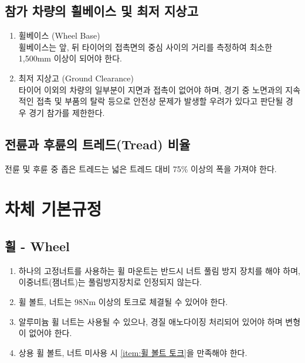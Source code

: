 \documentclass[final,a4paper,10pt]{report}
\begin{document}
\section{참가 차량의 휠베이스 및 최저 지상고}
\begin{enumerate}
  \item 휠베이스 (Wheel Base)\\
    휠베이스는 앞, 뒤 타이어의 접촉면의 중심 사이의 거리를 측정하여 최소한 1,500mm 이상이 되어야 한다.
  \item 최저 지상고 (Ground Clearance)\\
    타이어 이외의 차량의 일부분이 지면과 접촉이 없어야 하며, 경기 중 노면과의 지속적인 접촉 및 부품의 탈락 등으로 안전상 문제가 발생할 우려가 있다고 판단될 경우 경기 참가를 제한한다.
\end{enumerate}

\section{전륜과 후륜의 트레드(Tread) 비율}
전륜 및 후륜 중 좁은 트레드는 넓은 트레드 대비 75\% 이상의 폭을 가져야 한다.

\chapter{차체 기본규정}

\section{휠 - Wheel}
\begin{enumerate}
  \item 하나의 고정너트를 사용하는 휠 마운트는 반드시 너트 풀림 방지 장치를 해야 하며, 이중너트(잼너트)는 풀림방지장치로 인정되지 않는다.
  \item \label{item:휠 볼트 토크} 휠 볼트, 너트는 98Nm 이상의 토크로 체결될 수 있어야 한다.
  \item 알루미늄 휠 너트는 사용될 수 있으나, 경질 애노다이징 처리되어 있어야 하며 변형이 없어야 한다.
  \item 상용 휠 볼트, 너트 미사용 시 \cref{item:휠 볼트 토크}을 만족해야 한다.
\end{enumerate}
\end{document}
